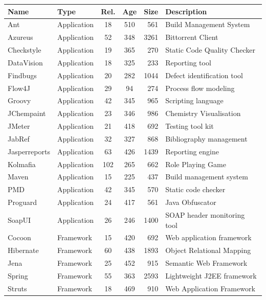 \begin{table}[!]
\centering
\small
\vspace{-0.6cm}
\begin{tabular}{|l|l||c|c|r|p{}|}
\hline
{\bf Name} & {\bf Type} & {\bf Rel.} & {\bf Age} &
             {\bf Size} & {\bf Description}
\\
\hline \hline
Ant&Application&18 & 510 & 561 & Build Management System\\
\hline
Azureus&Application&52 & 348 & 3261 & Bittorrent Client\\
\hline
Checkstyle&Application&19 & 365 & 270 & Static Code Quality Checker\\
\hline
DataVision&Application&18 & 325 & 233 & Reporting tool\\
\hline
Findbugs&Application&20 & 282 & 1044 & Defect identification tool\\
\hline
Flow4J&Application&29 & 94 & 274 & Process flow modeling\\
\hline
Groovy&Application&42 & 345 & 965 & Scripting language\\
\hline
JChempaint&Application&23 & 346 & 986 & Chemistry Visualisation\\
\hline
JMeter&Application&21 & 418 & 692 & Testing tool kit\\
\hline
JabRef&Application&32 & 327 & 868 & Bibliography management\\
\hline
Jasperreports&Application&63 & 426 & 1439 & Reporting engine\\
\hline
Kolmafia&Application&102 & 265 & 662 & Role Playing Game\\
\hline
Maven&Application&15 & 225 & 437 & Build management system\\
\hline
PMD&Application&42 & 345 & 570 & Static code checker\\
\hline
Proguard&Application&24 & 417 & 561 & Java Obfuscator\\
\hline
SoapUI&Application&26 & 246 & 1400 & SOAP header monitoring tool\\
\hline
\hline
Cocoon&Framework&15 & 420 & 692 & Web application framework\\
\hline
Hibernate&Framework&60 & 438 & 1893 & Object Relational Mapping\\
\hline
Jena&Framework&25 & 452 & 915 & Semantic Web Framework\\
\hline
Spring&Framework&55 & 363 & 2593 & Lightweight J2EE framework\\
\hline
Struts&Framework&18 & 469 & 910 & Web Application Framework\\

\end{tabular}
\end{table}
